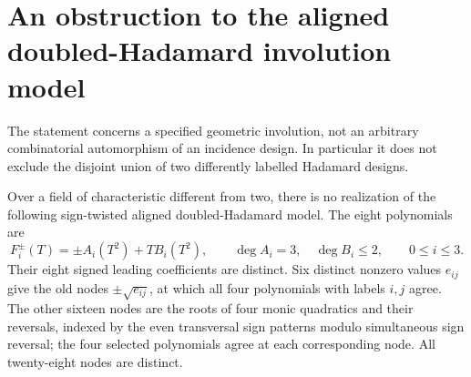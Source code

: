 \section{An obstruction to the aligned doubled-Hadamard involution model}
\label{app:c2-norm-obstruction}

The statement concerns a specified geometric involution, not an arbitrary
combinatorial automorphism of an incidence design. In particular it does not
exclude the disjoint union of two differently labelled Hadamard designs.

\begin{theorem}\label{thm:c2-norm-obstruction}
Over a field of characteristic different from two, there is no realization
of the following sign-twisted aligned doubled-Hadamard model. The eight
polynomials are
\[
 F_i^\pm(T)=\pm A_i(T^2)+T B_i(T^2),\qquad
 \deg A_i=3,\quad\deg B_i\le2,\qquad 0\le i\le3.
\]
Their eight signed leading coefficients are distinct. Six distinct nonzero
values $e_{ij}$ give the old nodes $\pm\sqrt{e_{ij}}$, at which all four
polynomials with labels $i,j$ agree. The other sixteen nodes are the roots
of four monic quadratics and their reversals, indexed by the even transversal
sign patterns modulo simultaneous sign reversal; the four selected
polynomials agree at each corresponding node. All twenty-eight nodes are
distinct.
\end{theorem}

